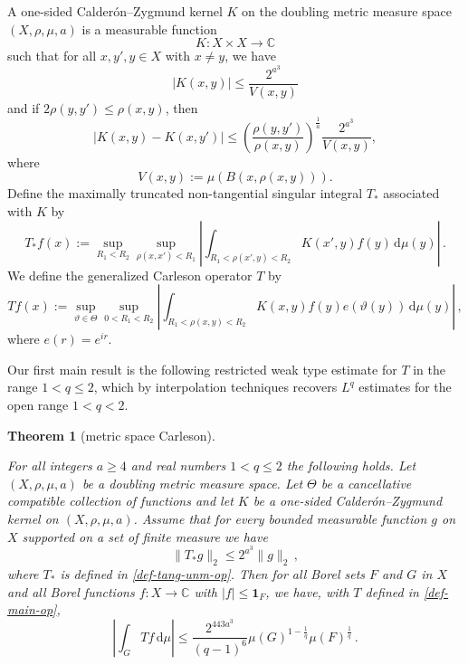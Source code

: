 \documentclass[10pt,a4paper]{article}
\theoremstyle{plain}
\newtheorem{theorem}{Theorem}[subsection]
\theoremstyle{definition}
\numberwithin{equation}{subsection}
\newcommand{\mfa}{{\vartheta}}
\newcommand{\Mf}{{\Theta}}
\newcommand{\lean}[1]{}
\newcommand{\uses}[1]{}
\newcommand{\leanok}{}
\def\C{\mathbb{C}}
\begin{document}
A one-sided Calder\'on--Zygmund kernel $K$ on the doubling metric measure space $(X, \rho, \mu, a)$ is a measurable function
\begin{equation}\label{eqkernel0}
  K:X\times X\to \mathbb{C}
\end{equation}
such that for all $x,y',y\in X$ with $x\neq y$, we have
\begin{equation}\label{eqkernel-size}
    |K(x,y)| \leq \frac{2^{a^3}}{V(x,y)}
\end{equation}
and if $2\rho(y,y') \leq \rho(x,y)$, then
\begin{equation}
  \label{eqkernel-y-smooth}
  |K(x,y) - K(x,y')| \leq \left(\frac{\rho(y,y')}{\rho(x,y)}\right)^{\frac{1}{a}}\frac{2^{a^3}}{V(x,y)},
\end{equation}
where \[V(x,y):=\mu(B(x,\rho(x,y))).\]
Define the maximally truncated non-tangential singular integral $T_{*}$ associated with $K$ by
\begin{equation}
    \label{def-tang-unm-op}
    T_{*}f(x):=\sup_{R_1 < R_2} \sup_{\rho(x,x')<R_1} \left|\int_{R_1< \rho(x',y) < R_2} K(x',y) f(y) \, \mathrm{d}\mu(y) \right|\,.
\end{equation}
We define the generalized Carleson operator $T$ by
\begin{equation}
    \label{def-main-op}
    Tf(x):=\sup_{\mfa\in\Mf} \sup_{0 < R_1 < R_2}\left| \int_{R_1 < \rho(x,y) < R_2} K(x,y) f(y) e(\mfa(y)) \, \mathrm{d}\mu(y) \right|\, ,
\end{equation}
where $e(r)=e^{ir}$.

Our first main result is the following restricted weak type estimate for $T$ in the range $1<q\le 2$,
which by interpolation techniques recovers $L^q$ estimates for the open range $1<q<2$.
\begin{theorem}[metric space Carleson]
\label{metric-space-Carleson}
\uses{linearised-metric-Carleson,int-continuous}
\leanok
\lean{metric_carleson}
    For all integers $a \ge 4$ and real numbers $1<q\le 2$ the following holds.
    Let $(X,\rho,\mu,a)$ be a doubling metric measure space.
    Let $\Mf$ be a cancellative compatible collection of functions and let $K$ be a one-sided Calder\'on--Zygmund kernel on $(X,\rho,\mu,a)$.
    Assume that for every bounded measurable function $g$ on $X$ supported on a set of finite measure we have
    \begin{equation}\label{nontanbound}
        \|T_{*}g\|_{2} \leq 2^{a^3} \|g\|_2\,,
    \end{equation}
    where $T_{*}$ is defined in \eqref{def-tang-unm-op}.
    Then for all Borel sets $F$ and $G$ in $X$ and all Borel functions $f:X\to \C$ with
    $|f|\le \mathbf{1}_F$, we have, with $T$ defined in \eqref{def-main-op},
    \begin{equation}
        \label{resweak}
        \left|\int_{G} T f \, \mathrm{d}\mu\right| \leq \frac{2^{443a^3}}{(q-1)^6} \mu(G)^{1-\frac{1}{q}} \mu(F)^{\frac{1}{q}}\, .
    \end{equation}
\end{theorem}
\end{document}
